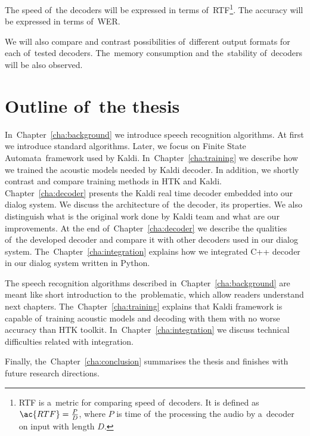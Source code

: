 The speed of~the decoders will be expressed in terms of~\ac{RTF}\footnote{\ac{RTF} is a~metric for comparing speed of~decoders. It is defined as $\ac{RTF} = \frac{P}{D}$, where $P$ is time of~the processing the audio by a~decoder on input with length $D$.}. The accuracy will be expressed in terms of~\ac{WER}.

We will also compare and contrast possibilities of~different output formats for each of~tested decoders. The~memory consumption and the~stability of~decoders will be also observed. 



\section{Outline of~the thesis} 
\label{sec:outline_of_the_thesis}
In~Chapter~\ref{cha:background} we introduce speech recognition algorithms. At first we introduce standard algorithms. Later, we focus on Finite State Automata~framework used by Kaldi. In~Chapter~\ref{cha:training} we describe how we trained the acoustic models needed by Kaldi decoder. In addition, we shortly contrast and compare training methods in \ac{HTK} and Kaldi. Chapter~\ref{cha:decoder} presents the Kaldi real time decoder embedded into our dialog system. We discuss the architecture of~the decoder, its properties. We also distinguish what is the original work done by Kaldi team and what are our improvements. At the end of~Chapter~\ref{cha:decoder} we describe the qualities of~the developed decoder and compare it with other decoders used in our dialog system.
The~Chapter~\ref{cha:integration} explains how we integrated C++ decoder in our dialog system written in Python.
    
The speech recognition algorithms described in~Chapter~\ref{cha:background} are meant like short introduction to the~problematic, which allow readers understand next chapters. The~Chapter~\ref{cha:training} explains that Kaldi framework is capable of~training acoustic models and decoding with them with no worse accuracy than \ac{HTK} toolkit. In~Chapter~\ref{cha:integration} we discuss technical difficulties related with integration. 

Finally, the~Chapter~\ref{cha:conclusion} summarises the thesis and finishes with future research directions.

